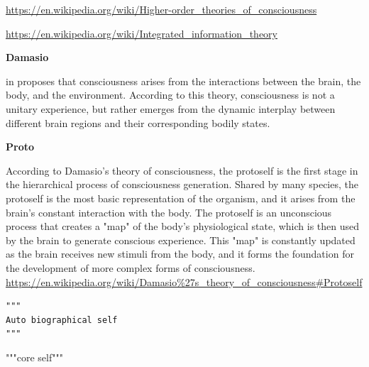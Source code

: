 \documentclass{book}
\providecommand{\ProjectDeepHeading}[2]{%
    \par\medskip\noindent\textbf{#2}\par\smallskip
}
\begin{document}

\url{https://en.wikipedia.org/wiki/Higher-order_theories_of_consciousness}


\url{https://en.wikipedia.org/wiki/Integrated_information_theory}

\ProjectDeepHeading{3}{Damasio}


in \cite{damasio-1999-the-feeling-of-what-happens} proposes that consciousness arises from the interactions between the brain, the body, and the environment. According to this theory, consciousness is not a unitary experience, but rather emerges from the dynamic interplay between different brain regions and their corresponding bodily states.

\ProjectDeepHeading{4}{Proto}


According to Damasio's theory of consciousness, the protoself is the first stage in the hierarchical process of consciousness generation. Shared by many species, the protoself is the most basic representation of the organism, and it arises from the brain's constant interaction with the body. The protoself is an unconscious process that creates a "map" of the body's physiological state, which is then used by the brain to generate conscious experience. This "map" is constantly updated as the brain receives new stimuli from the body, and it forms the foundation for the development of more complex forms of consciousness.
    \url{https://en.wikipedia.org/wiki/Damasio%27s_theory_of_consciousness#Protoself}
    


\begin{verbatim}
"""
Auto biographical self
"""
\end{verbatim}


"""core self"""

\end{document}
